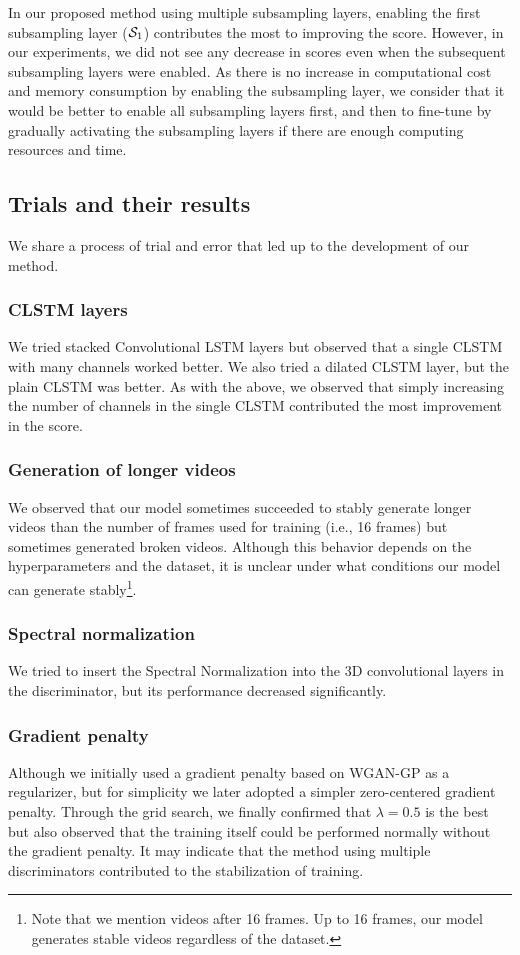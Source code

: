 \documentclass[twocolumn]{svjour3}
\begin{document}
In our proposed method using multiple subsampling layers,
enabling the first subsampling layer (${\cal S}_1$) contributes the most to improving the score.
However, in our experiments, we did not see any decrease in scores even when the subsequent subsampling layers were enabled.
As there is no increase in computational cost and memory consumption by enabling the subsampling layer,
we consider that it would be better to enable all subsampling layers first,
and then to fine-tune by gradually activating the subsampling layers
if there are enough computing resources and time.

\subsection{Trials and their results}
We share a process of trial and error that led up to the development of our method.

\subsubsection{CLSTM layers}
We tried stacked Convolutional LSTM layers but observed that a single CLSTM with many channels worked better.
We also tried a dilated CLSTM layer, but the plain CLSTM was better. As with the above, we observed that simply increasing the number of channels in the single CLSTM contributed the most improvement in the score.

\subsubsection{Generation of longer videos}
We observed that our model sometimes succeeded to stably generate longer videos than the number of frames used for training (i.e., 16 frames) but sometimes generated broken videos.
Although this behavior depends on the hyperparameters and the dataset, it is unclear under what conditions our model can generate stably\footnote{Note that we mention videos after 16 frames. Up to 16 frames, our model generates stable videos regardless of the dataset.}.

\subsubsection{Spectral normalization}
We tried to insert the Spectral Normalization \cite{Miyato2018} into the 3D convolutional layers in the discriminator, but its performance decreased significantly.

\subsubsection{Gradient penalty}
Although we initially used a gradient penalty based on WGAN-GP \cite{Gulrajani2017} as a regularizer, but for simplicity we later adopted a simpler zero-centered gradient penalty.
Through the grid search, we finally confirmed that $\lambda = 0.5$ is the best but also observed that the training itself could be performed normally without the gradient penalty.
It may indicate that the method using multiple discriminators contributed to the stabilization of training.
\end{document}

